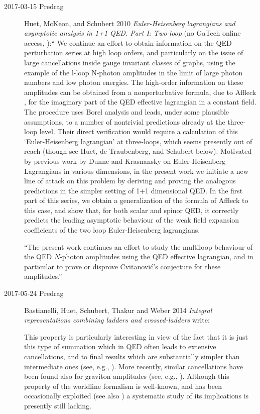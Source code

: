\begin{description}
\item[2017-03-15 Predrag]
Huet, McKeon, and Schubert 2010
{\em {Euler-Heisenberg} lagrangians and asymptotic analysis in 1+1 {QED. Part I: Two}-loop}
(no GaTech online access, ):``
We continue an effort to obtain information on the QED perturbation
series at high loop orders, and particularly on the issue of large
cancellations inside gauge invariant classes of graphs, using the example
of the l-loop N-photon amplitudes in the limit of large photon
numbers and low photon energies. The high-order
information on these amplitudes can be obtained from a nonperturbative
formula, due to Affleck \etal{}, for the imaginary part of the QED
effective lagrangian in a constant field. The procedure uses Borel
analysis and leads, under some plausible assumptions, to a number of
nontrivial predictions already at the three-loop level. Their direct
verification would require a calculation of this `Euler-Heisenberg
lagrangian' at three-loops, which seems presently out of reach
(though see Huet, de Traubenberg, and Schubert below). Motivated
by previous work by Dunne and Krasnansky on Euler-Heisenberg
Lagrangians in various dimensions, in the present work we initiate a new
line of attack on this problem by deriving and proving the analogous
predictions in the simpler setting of 1+1 dimensional QED. In the first
part of this series, we obtain a generalization of the formula of
Affleck \etal{}
to this case, and show that, for both scalar and spinor QED, it
correctly predicts the leading asymptotic behaviour of the weak field
expansion coefficients of the two loop Euler-Heisenberg lagrangians.

``The present work continues an
effort to study the multiloop
behaviour of the QED $N$-photon amplitudes using the QED effective
lagrangian, and in particular to prove or disprove Cvitanovi\'c's
conjecture for these amplitudes.''

\item[2017-05-24 Predrag]
Bastianelli, Huet, Schubert, Thakur and Weber 2014
{\em Integral representations combining ladders and crossed-ladders}
write:

This property is particularly interesting in view of the fact that it is
just this type of summation which in QED often leads to extensive
cancellations, and to final results which are substantially simpler than
intermediate ones (see, e.g., ). More recently, similar
cancellations have been found also for graviton amplitudes (see, e.g.,
).
Although this property of the worldline formalism is well-known, and has
been occasionally exploited (see also
) a systematic study of its implications is
presently still lacking.


\end{description}
